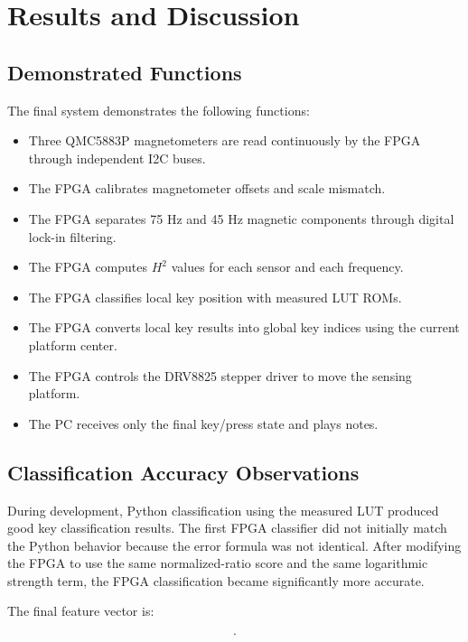 \section{Results and Discussion}
\label{sec:results_discussion}

\subsection{Demonstrated Functions}

The final system demonstrates the following functions:

\begin{itemize}
    \item Three QMC5883P magnetometers are read continuously by the FPGA through independent I2C buses.
    \item The FPGA calibrates magnetometer offsets and scale mismatch.
    \item The FPGA separates 75 Hz and 45 Hz magnetic components through digital lock-in filtering.
    \item The FPGA computes $H^2$ values for each sensor and each frequency.
    \item The FPGA classifies local key position with measured LUT ROMs.
    \item The FPGA converts local key results into global key indices using the current platform center.
    \item The FPGA controls the DRV8825 stepper driver to move the sensing platform.
    \item The PC receives only the final key/press state and plays notes.
\end{itemize}

\subsection{Classification Accuracy Observations}

During development, Python classification using the measured LUT produced good key classification results. The first FPGA classifier did not initially match the Python behavior because the error formula was not identical. After modifying the FPGA to use the same normalized-ratio score and the same logarithmic strength term, the FPGA classification became significantly more accurate.

The final feature vector is:

\begin{equation}
    [f_1, f_2, f_3, \ln(H_{\mathrm{total}}^2)].
\end{equation}

